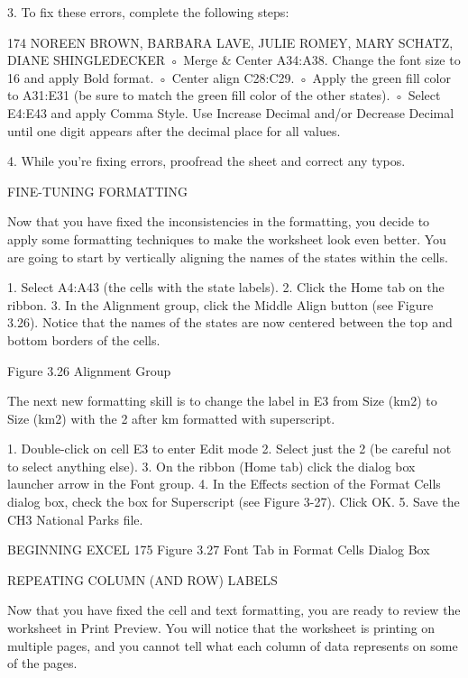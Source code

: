 3. To fix these errors, complete the following steps:


174 NOREEN BROWN, BARBARA LAVE, JULIE ROMEY, MARY SCHATZ, DIANE SHINGLEDECKER
◦ Merge & Center A34:A38. Change the font size to 16 and apply Bold format.
◦ Center align C28:C29.
◦ Apply the green fill color to A31:E31 (be sure to match the green fill color of the other states).
◦ Select E4:E43 and apply Comma Style. Use Increase Decimal and/or Decrease Decimal until
one digit appears after the decimal place for all values.

4. While you’re fixing errors, proofread the sheet and correct any typos.

FINE-TUNING FORMATTING

Now that you have fixed the inconsistencies in the formatting, you decide to apply some formatting
techniques to make the worksheet look even better. You are going to start by vertically aligning the
names of the states within the cells.

1. Select A4:A43 (the cells with the state labels).
2. Click the Home tab on the ribbon.
3. In the Alignment group, click the Middle Align button (see Figure 3.26). Notice that the names
of the states are now centered between the top and bottom borders of the cells.




Figure 3.26 Alignment Group


The next new formatting skill is to change the label in E3 from Size (km2) to Size (km2) with the 2
after km formatted with superscript.

1. Double-click on cell E3 to enter Edit mode
2. Select just the 2 (be careful not to select anything else).
3. On the ribbon (Home tab) click the dialog box launcher arrow in the Font group.
4. In the Effects section of the Format Cells dialog box, check the box for Superscript (see Figure
3-27). Click OK.
5. Save the CH3 National Parks file.




BEGINNING EXCEL 175
Figure 3.27 Font Tab in Format Cells Dialog Box


REPEATING COLUMN (AND ROW) LABELS

Now that you have fixed the cell and text formatting, you are ready to review the worksheet in Print
Preview. You will notice that the worksheet is printing on multiple pages, and you cannot tell what
each column of data represents on some of the pages.

